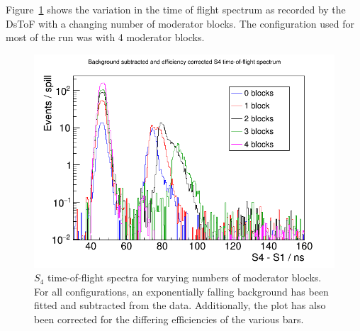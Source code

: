 	Figure~\ref{fig:dtof_nmodblocks} shows the variation in the time of flight spectrum as recorded by the DsToF with a changing number of moderator blocks. The configuration used for most of the run was with 4 moderator blocks. 
			
	

   	\begin{figure}[h]
        \centering
	    \includegraphics[width=0.7\linewidth]{files/Figures/s4ToF_axisAdj.png}
        \caption{$S_{4}$ time-of-flight spectra for varying numbers of moderator blocks. For all configurations, an exponentially falling background has been fitted and subtracted from the data. Additionally, the plot has also been corrected for the differing efficiencies of the various bars.}
        \label{fig:dtof_nmodblocks}	
   	\end{figure}
   
